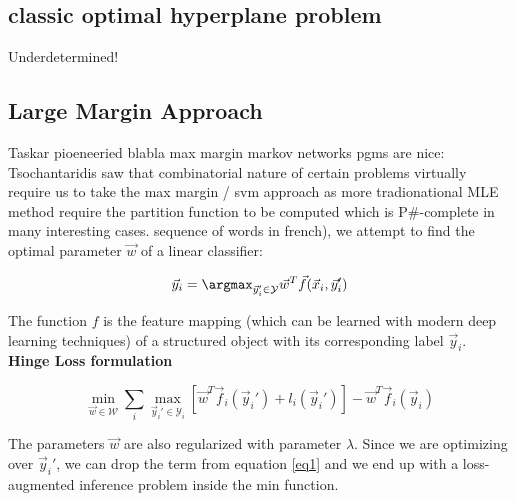 \subsection{classic optimal hyperplane problem}
Underdetermined!



\clearpage
\subsection{Large Margin Approach}
Taskar pioeneeried blabla max margin markov networks pgms are nice: \cite{taskarMaxMarginMarkovNetworks2004}
Tsochantaridis saw that combinatorial nature of certain problems virtually
require us to take the max margin / svm approach as more tradionational MLE
method require the partition function to be computed which is P\#-complete in
many interesting cases.\cite{tsochantaridisSupportVectorMachine}
 sequence of words in french), we attempt to find the optimal parameter $\vec w$
of a linear classifier:

\begin{equation}
  \vec y_i = \argmax_{\vec y_i' \in \mathcal{Y}} \vec w^T \vec f(\vec x_i,\vec y_i')
  \label{eq1}
\end{equation}

The function $f$ is the feature mapping (which can be learned with modern deep
learning techniques) of a structured object with its
corresponding label $\vec y_i$. \textbf{Hinge Loss formulation}

\begin{equation}
  \min_{\vec w \in \mathcal{W}} \sum_i \max_{\vec y_i' \in \mathcal{Y}_i} \left[
\vec w^T \vec f_i(\vec y_i') + l_i(\vec y_i') \right] - \vec w^T \vec f_i(\vec
y_i)
\end{equation}

The parameters $\vec w$ are also regularized with parameter $\lambda$. Since we are
optimizing over $\vec y_i'$, we can drop the term from equation \ref{eq1} and we end
up with a loss-augmented inference problem inside the min function.




